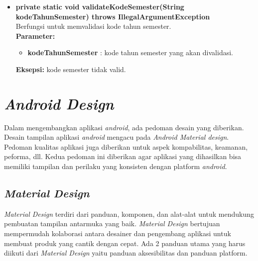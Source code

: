 \begin{itemize}
    \item \textbf{private static void validateKodeSemester(String kodeTahunSemester) throws IllegalArgumentException} \\
		Berfungsi untuk memvalidasi kode tahun semester. \\
		\textbf{Parameter:} 
		\begin{itemize}
			\item \textbf{kodeTahunSemester} : kode tahun semester yang akan divalidasi.
		\end{itemize}
		\textbf{Eksepsi:} kode semester tidak valid.
\end{itemize}

\section{\textit{Android Design}}
\label{sec:android design}
Dalam mengembangkan aplikasi \textit{android}, ada pedoman desain yang diberikan. Desain tampilan aplikasi \textit{android} mengacu pada \textit{Android Material design}. Pedoman kualitas aplikasi juga diberikan untuk aspek kompabilitas, keamanan, peforma, dll. Kedua pedoman ini diberikan agar aplikasi yang dihasilkan bisa memiliki tampilan dan perilaku yang konsisten dengan platform \textit{android}. 
 
\subsection{\textit{Material Design}}
\textit{Material Design} terdiri dari panduan, komponen, dan alat-alat untuk mendukung pembuatan tampilan antarmuka yang baik. \textit{Material Design} bertujuan mempermudah kolaborasi antara desainer dan pengembang aplikasi untuk membuat produk yang cantik dengan cepat\cite{materialdesign}. Ada 2 panduan utama yang harus diikuti dari \textit{Material Design} yaitu panduan aksesibilitas dan panduan platform. 

